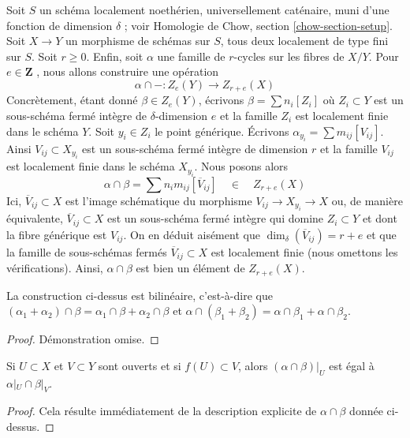 \noindent
 Soit  $S$  un schéma localement noethérien, universellement caténaire, muni 
d'une fonction de dimension  $\delta$ ; voir
 Homologie de Chow, section \ref{chow-section-setup}. 
Soit  $X \to Y$  un morphisme de schémas sur  $S$, tous deux localement de type
 fini sur  $S$. Soit  $r \geq 0$. Enfin, soit $\alpha$  une famille de  
$r$-cycles sur les fibres de  $X/Y$. Pour  $e \in \mathbf{Z}$
 , nous allons construire une opération 
$$
\alpha \cap - : Z_e(Y) \longrightarrow Z_{r + e}(X)
$$
 Concrètement, étant donné  $\beta \in Z_e(Y)$, écrivons  $\beta = \sum n_i[Z_i]$
  où  $Z_i \subset Y$  est un sous-schéma fermé intègre de  
$\delta$-dimension  $e$  et la 
famille $Z_i$  est localement finie dans le schéma  $Y$. 
Soit  $y_i \in Z_i$ le point générique. Écrivons  
$\alpha_{y_i} = \sum m_{ij} [V_{ij}]$. Ainsi  $V_{ij} \subset X_{y_i}$
  est un sous-schéma fermé intègre de dimension  $r$  et la famille 
$V_{ij}$ est localement finie dans le schéma $X_{y_i}$. 
Nous posons alors 
$$
\alpha \cap \beta = \sum n_i m_{ij} [\overline{V}_{ij}]
\quad\in\quad
Z_{r + e}(X)
$$
 Ici, $\overline{V}_{ij} \subset X$ est l'image schématique 
du morphisme $V_{ij} \to X_{y_i} \to X$ ou, de manière équivalente, 
$\overline{V}_{ij} \subset X$ est un sous-schéma fermé 
intègre qui domine $Z_i \subset Y$ et dont la fibre générique est $V_{ij}$.
 On en déduit aisément que $\dim_\delta(\overline{V}_{ij}) = r + e$
 et que la famille de sous-schémas fermés 
$\overline{V}_{ij} \subset X$ est localement finie (nous omettons les vérifications). 
Ainsi, $\alpha \cap \beta$ est bien un élément de $Z_{r + e}(X)$. 

\begin{lemma} 
\label{lemma-action-bilinear} La 
construction ci-dessus est bilinéaire, c'est-à-dire que 
$(\alpha_1 + \alpha_2) \cap \beta = \alpha_1 \cap \beta +
\alpha_2 \cap \beta$ et $\alpha \cap (\beta_1 + \beta_2) =
\alpha \cap \beta_1 + \alpha \cap \beta_2$. 
\end{lemma} 

\begin{proof} 
Démonstration omise. 
\end{proof} 

\begin{lemma} 
\label{lemma-action-opens} 
Si $U \subset X$ et $V \subset Y$ sont ouverts et si $f(U) \subset V$, alors 
$(\alpha \cap \beta)|_U$ est égal à $\alpha|_U \cap \beta|_V$. 
\end{lemma} 

\begin{proof} 
Cela résulte immédiatement de la description explicite de $\alpha \cap \beta$
 donnée ci-dessus. 
\end{proof} 

